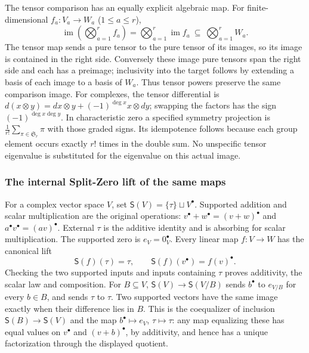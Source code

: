The tensor comparison has an equally explicit algebraic map.  For
finite-dimensional $f_a:V_a\to W_a$ ($1\leq a\leq r$),
\[
 \operatorname{im}\left(\bigotimes_{a=1}^r f_a\right)
 =\bigotimes_{a=1}^r\operatorname{im}f_a
 \ \subseteq\ \bigotimes_{a=1}^r W_a.
 \tag{DS9}
\]
The tensor map sends a pure tensor to the pure tensor of its images,
so its image is contained in the right side.  Conversely these image
pure tensors span the right side and each has a preimage; inclusivity
into the target follows by extending a basis of each image to a basis
of $W_a$.  Thus tensor powers preserve the same comparison image.
For complexes, the tensor differential is
$d(x\otimes y)=dx\otimes y+(-1)^{\deg x}x\otimes dy$; swapping
the factors has the sign $(-1)^{\deg x\deg y}$.  In characteristic
zero a specified symmetry projection is
$\frac1{r!}\sum_{\pi\in\mathfrak S_r}\pi$ with those graded signs.
Its idempotence follows because each group element occurs exactly
$r!$ times in the double sum.  No unspecific tensor eigenvalue is
substituted for the eigenvalue on this actual image.

\subsubsection{The internal Split-Zero lift of the same maps}

For a complex vector space $V$, set $\mathsf S(V)=\{\tau\}\sqcup V^\bullet$.
Supported addition and scalar multiplication are the original operations:
$v^\bullet+w^\bullet=(v+w)^\bullet$ and
$a^\bullet v^\bullet=(av)^\bullet$.  External $\tau$ is the additive
identity and is absorbing for scalar multiplication.  The supported
zero is $e_V=0_V^\bullet$.  Every linear map $f:V\to W$ has the
canonical lift
\[
 \mathsf S(f)(\tau)=\tau,\qquad
 \mathsf S(f)(v^\bullet)=f(v)^\bullet.
 \tag{DS10}
\]
Checking the two supported inputs and inputs containing $\tau$ proves
additivity, the scalar law and composition.  For $B\subseteq V$,
$\mathsf S(V)\to\mathsf S(V/B)$ sends $b^\bullet$ to $e_{V/B}$ for
every $b\in B$, and sends $\tau$ to $\tau$.  Two supported vectors
have the same image exactly when their difference lies in $B$.
This is the coequalizer of inclusion $\mathsf S(B)\to\mathsf S(V)$
and the map $b^\bullet\mapsto e_V$, $\tau\mapsto\tau$: any map
equalizing these has equal values on $v^\bullet$ and $(v+b)^\bullet$,
by additivity, and hence has a unique factorization through the
displayed quotient.

